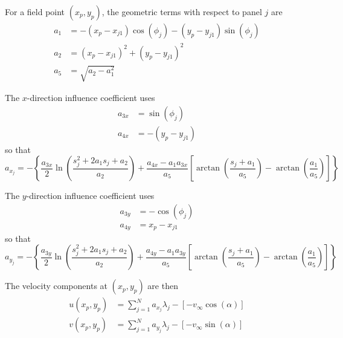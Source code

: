 For a field point $(x_p, y_p)$, the geometric terms with respect to panel $j$ are
\begin{align*}
a_1 &= -(x_p - x_{j1})\cos(\phi_j) - (y_p - y_{j1})\sin(\phi_j) \\
a_2 &= (x_p - x_{j1})^2 + (y_p - y_{j1})^2 \\
a_5 &= \sqrt{a_2 - a_1^2}
\end{align*}

The $x$-direction influence coefficient uses
\begin{align*}
a_{3x} &= \sin(\phi_j) \\
a_{4x} &= -(y_p - y_{j1})
\end{align*}
so that
\[
a_{x_{j}} = -\left\{\frac{a_{3x}}{2} \ln\!\left(\frac{s_j^2 + 2 a_1 s_j + a_2}{a_2}\right) + \frac{a_{4x} - a_1 a_{3x}}{a_5}\left[\arctan\!\left(\frac{s_j + a_1}{a_5}\right) - \arctan\!\left(\frac{a_1}{a_5}\right)\right]\right\}
\]

The $y$-direction influence coefficient uses
\begin{align*}
a_{3y} &= -\cos(\phi_j) \\
a_{4y} &= x_p - x_{j1}
\end{align*}
so that
\[
a_{y_{j}} = -\left\{\frac{a_{3y}}{2} \ln\!\left(\frac{s_j^2 + 2 a_1 s_j + a_2}{a_2}\right) + \frac{a_{4y} - a_1 a_{3y}}{a_5}\left[\arctan\!\left(\frac{s_j + a_1}{a_5}\right) - \arctan\!\left(\frac{a_1}{a_5}\right)\right]\right\}
\]

The velocity components at $(x_p, y_p)$ are then
\begin{align*}
u(x_p, y_p) &= \sum_{j=1}^{N} a_{x_{j}} \lambda_j - \left[-v_\infty \cos(\alpha)\right] \\
v(x_p, y_p) &= \sum_{j=1}^{N} a_{y_{j}} \lambda_j - \left[-v_\infty \sin(\alpha)\right]
\end{align*}
